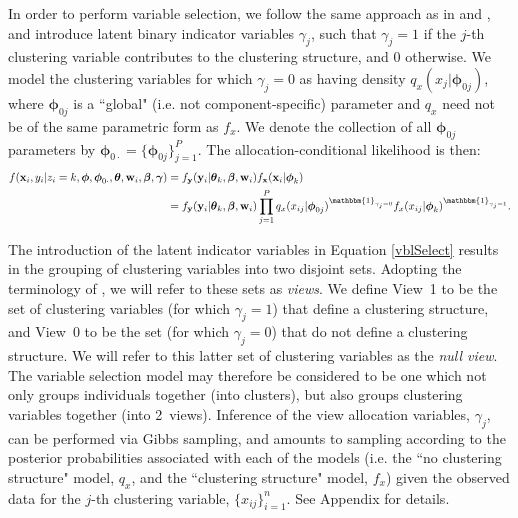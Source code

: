 \documentclass[12pt]{article}
\begin{document}
In order to perform variable selection, we follow the same approach as in \citet{Law2003,Law2004} and \citet{Tadesse2005}, and introduce latent binary indicator variables $\gamma_j$, such that $\gamma_j = 1$ if the $j$-th clustering variable contributes to the clustering structure, and 0 otherwise.  We model the clustering variables for which $\gamma_j = 0$ as having density $q_{x}(x_j | \boldsymbol{\phi}_{0j})$, where $\boldsymbol{\phi}_{0j}$ is a ``global" (i.e. not component-specific) parameter and $q_x$ need not be of the same parametric form as $f_x$.  We denote the collection of all $\boldsymbol{\phi}_{0j}$ parameters by $\boldsymbol{\phi}_{0\cdot} = \{ \boldsymbol{\phi}_{0j}\}_{j = 1}^P$. The allocation-conditional likelihood is then:
\begin{align}
f(\mathbf{x}_i,y_i | z_i = k, \boldsymbol{\phi}, \boldsymbol{\phi}_{0\cdot}, \boldsymbol{\theta}, {\bf w}_i, \boldsymbol{\beta},\boldsymbol{\gamma}) &=f_\mathbf{y}({\bf y}_i|\boldsymbol{\theta}_k,\boldsymbol{\beta},\mathbf{w}_i) f_\mathbf{x}(\mathbf{x}_i | \boldsymbol{\phi}_k)\notag\\
&= f_{\bf y}({\bf y}_i|\boldsymbol{\theta}_k,\boldsymbol{\beta},\mathbf{w}_i)\prod_{j=1}^P q_x(x_{ij} | \boldsymbol{\phi}_{0j})^{\mathbbm{1}_{\gamma_j = 0}} f_x(x_{ij} | \boldsymbol{\phi}_k)^{\mathbbm{1}_{\gamma_j = 1}} .\label{vblSelect}\vspace{-0.5cm}
\end{align}

The introduction of the latent indicator variables in Equation \eqref{vblSelect} results in the grouping of clustering variables into two disjoint sets.  Adopting the terminology of \citet{Cui2007}, we will refer to these sets as {\em views}.  We define View~1 to be the set of clustering variables (for which $\gamma_j = 1$) that define a clustering structure, and View~0 to be the set (for which $\gamma_j = 0$) that do not define a clustering structure.  We will refer to this latter set of clustering variables as the {\em null view}. The variable selection model may therefore be considered to be one which not only groups individuals together (into clusters), but also groups clustering variables together (into 2~views).  Inference of the view allocation variables, $\gamma_j$, can be performed via Gibbs sampling, and amounts to sampling according to the posterior probabilities associated with each of the models (i.e. the ``no clustering structure" model, $q_x$, and the ``clustering structure" model, $f_x$) given the observed data for the $j$-th clustering variable, $\{ x_{ij}\}_{i=1}^n$.  See Appendix for details.
\end{document}
